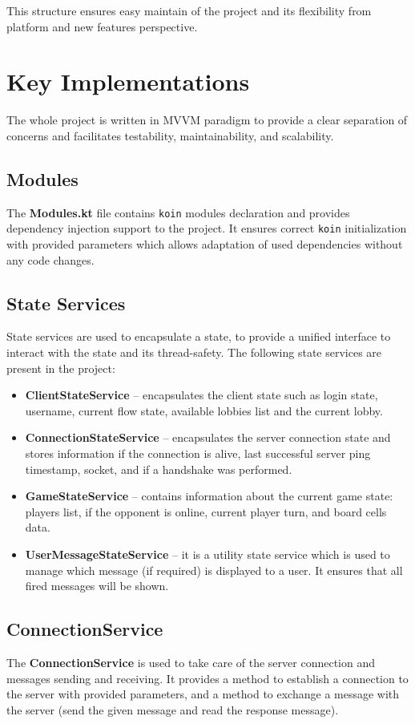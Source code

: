 \documentclass[english, sem, kiv, he, iso690alph, pdf, viewonly]{fasthesis}
\begin{document}
This structure ensures easy maintain of the project and its flexibility from platform and new features perspective.

\section{Key Implementations}

The whole project is written in \ac{MVVM} paradigm to provide a clear separation of concerns and facilitates testability, maintainability, and scalability.

\subsection{Modules}
The \textbf{Modules.kt} file contains \texttt{koin} modules declaration and provides dependency injection support to the project. It ensures correct \texttt{koin} initialization with provided parameters which allows adaptation of used dependencies without any code changes.

\subsection{State Services}
State services are used to encapsulate a state, to provide a unified interface to interact with the state and its thread-safety. The following state services are present in the project:
\begin{itemize}
	\item \textbf{ClientStateService} -- encapsulates the client state such as login state, username, current flow state, available lobbies list and the current lobby.
	\item \textbf{ConnectionStateService} -- encapsulates the server connection state and stores information if the connection is alive, last successful server ping timestamp, socket, and if a handshake was performed.
	\item \textbf{GameStateService} -- contains information about the current game state: players list, if the opponent is online, current player turn, and board cells data.
	\item \textbf{UserMessageStateService} -- it is a utility state service which is used to manage which message (if required) is displayed to a user. It ensures that all fired messages will be shown.
\end{itemize}

\subsection{ConnectionService}
The \textbf{ConnectionService} is used to take care of the server connection and messages sending and receiving. It provides a method to establish a connection to the server with provided parameters, and a method to exchange a message with the server (send the given message and read the response message).
\end{document}
